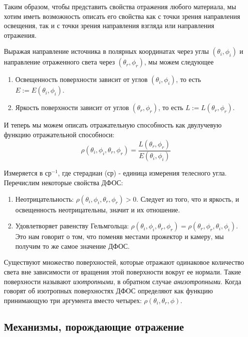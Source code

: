 \documentclass[12pt]{article}
\begin{document}
Таким образом, чтобы представить свойства отражения любого материала,
мы хотим иметь возможность описать его свойства как с точки зрения
направления освещения, так и с точки зрения направления взгляда или направления отражения.

Выражая направление источника в полярных координатах через углы $(\theta_i,\phi_i)$ и
направление отраженного света через $(\theta_r,\phi_r)$, мы можем следующее
\begin{enumerate}
  \item Освещенность поверхности зависит от углов $(\theta_i,\phi_i)$, то есть $E:=E(\theta_i,\phi_i)$.
  \item Яркость поверхности зависит от углов $(\theta_r,\phi_r)$, то есть $L:=L(\theta_r,\phi_r)$.
\end{enumerate}

И теперь мы можем описать отражательную способность как двулучевую функцию отражательной
способноси:
\begin{equation}
  \rho(\theta_i,\phi_i,\theta_r,\phi_r)=\frac{L(\theta_r,\phi_r)}{E(\theta_i,\phi_i)}
\end{equation}

Измеряется в ср$^{-1}$, где стерадиан (ср) - единица измерения телесного угла. Перечислим некоторые свойства ДФОС:
\begin{enumerate}
  \item Неотрицательность: $\rho(\theta_i,\phi_i,\theta_r,\phi_r)>0$. Следует из того, что и
        яркость, и освещенность неотрицательны, значит и их отношение.
  \item Удовлетворяет равенству Гельмгольца: $\rho(\theta_i,\phi_i,\theta_r,\phi_r)=\rho(\theta_r,\phi_r,\theta_i,\phi_i)$.
        Это нам говорит о том, что поменяв местами прожектор и камеру, мы получим то же самое значение ДФОС.
\end{enumerate}

Существуют множество поверхностей, которые отражают одинаковое количество света
вне зависимости от вращения этой поверхности вокруг ее нормали. Такие
поверхности называют \textit{изотропными}, в обратном случае \textit{анизотропными}.
Когда говорят об изотропных поверхностях ДФОС определяют как функцию принимающую три
аргумента вместо четырех: $\rho(\theta_i,\theta_r,\phi)$.

\subsection{Механизмы, порождающие отражение}
\end{document}
